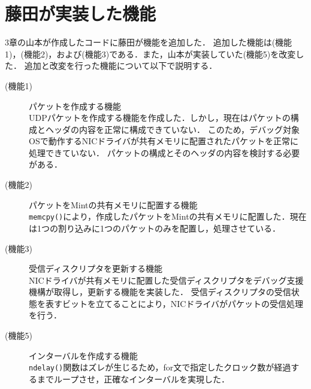 \documentclass[12pt]{jsarticle}
\begin{document}
\section{藤田が実装した機能}
3章の山本が作成したコードに藤田が機能を追加した．
追加した機能は(機能1)，(機能2)，および(機能3)である．また，山本が実装していた(機能5)を改変した．
追加と改変を行った機能について以下で説明する．
\begin{description}
    \item[(機能1)]パケットを作成する機能\\
        UDPパケットを作成する機能を作成した．しかし，現在はパケットの構成とヘッダの内容を正常に構成できていない．
        このため，デバッグ対象OSで動作するNICドライバが共有メモリに配置されたパケットを正常に処理できていない．
        パケットの構成とそのヘッダの内容を検討する必要がある．
    \item[(機能2)]パケットをMintの共有メモリに配置する機能\\
        {\tt memcpy()}により，作成したパケットをMintの共有メモリに配置した．現在は1つの割り込みに1つのパケットのみを配置し，処理させている．
    \item[(機能3)]受信ディスクリプタを更新する機能\\
        NICドライバが共有メモリに配置した受信ディスクリプタをデバッグ支援機構が取得し，更新する機能を実装した．
        受信ディスクリプタの受信状態を表すビットを立てることにより，NICドライバがパケットの受信処理を行う．
    \item[(機能5)]インターバルを作成する機能\\
        {\tt ndelay()}関数はズレが生じるため，for文で指定したクロック数が経過するまでループさせ，正確なインターバルを実現した．
\end{description}
\end{document}
